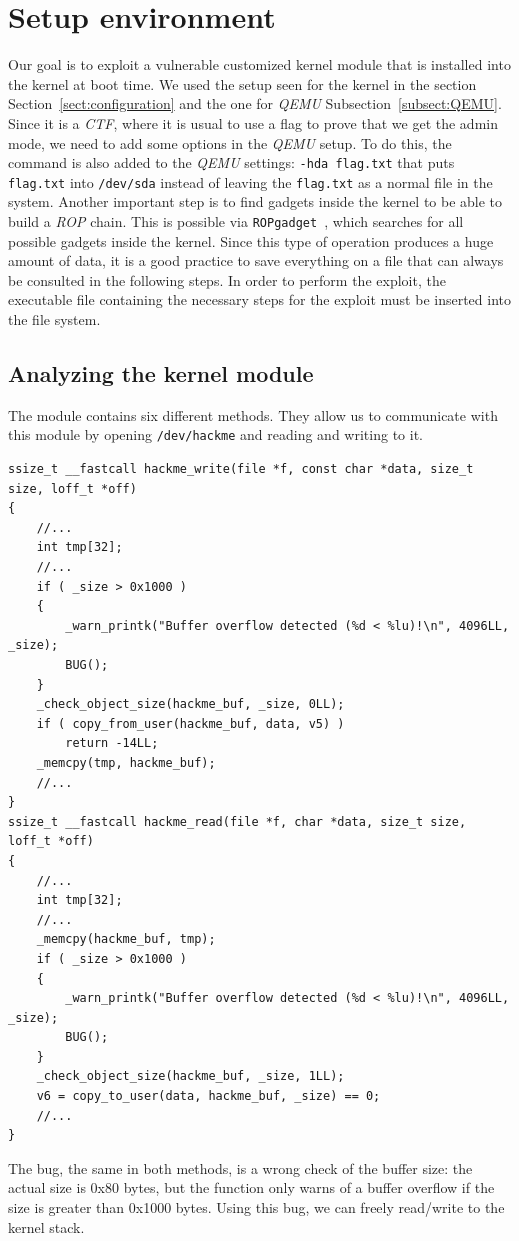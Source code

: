 \documentclass{masterthesis}
\newcommand{\refToSection}[1]{Section~\ref{sect:#1}\xspace}
\newcommand{\refToSubSection}[1]{Subsection~\ref{subsect:#1}\xspace}
\begin{document}
\section{Setup environment}
\label{sect:set-up}
Our goal is to exploit a vulnerable customized kernel module that is installed into the kernel at boot time.
We used the setup seen for the kernel in the section \refToSection{configuration} and the one for \emph{QEMU} \refToSubSection{QEMU}.
Since it is a \emph{CTF}, where it is usual to use a flag to prove that we get the admin mode, we need to add some options in the \emph{QEMU} setup.
To do this, the command is also added to the \emph{QEMU} settings:
\lstinline{-hda flag.txt}
that puts \texttt{flag.txt} into \texttt{/dev/sda} instead of leaving the \texttt{flag.txt} as a normal file in the system.
Another important step is to find gadgets inside the kernel to be able to build a \emph{ROP} chain.
This is possible via \texttt{ROPgadget}~\cite{rop_gadget}, which searches for all possible gadgets inside the kernel.
Since this type of operation produces a huge amount of data, it is a good practice to save everything on a file that can always be consulted in the following steps.
In order to perform the exploit, the executable file containing the necessary steps for the exploit must be inserted into the file system.
\subsection{Analyzing the kernel module}
\label{subsect:hackme}
The module contains six different methods.
They allow us to communicate with this module by opening \lstinline{/dev/hackme} and reading and writing to it.
\begin{lstlisting}
ssize_t __fastcall hackme_write(file *f, const char *data, size_t size, loff_t *off)
{
    //...
    int tmp[32];
    //...
    if ( _size > 0x1000 )
    {
        _warn_printk("Buffer overflow detected (%d < %lu)!\n", 4096LL, _size);
        BUG();
    }
    _check_object_size(hackme_buf, _size, 0LL);
    if ( copy_from_user(hackme_buf, data, v5) )
        return -14LL;
    _memcpy(tmp, hackme_buf);
    //...
}
ssize_t __fastcall hackme_read(file *f, char *data, size_t size, loff_t *off)
{
    //...
    int tmp[32];
    //...
    _memcpy(hackme_buf, tmp);
    if ( _size > 0x1000 )
    {
        _warn_printk("Buffer overflow detected (%d < %lu)!\n", 4096LL, _size);
        BUG();
    }
    _check_object_size(hackme_buf, _size, 1LL);
    v6 = copy_to_user(data, hackme_buf, _size) == 0;
    //...
}
\end{lstlisting}
The bug, the same in both methods, is a wrong check of the buffer size: the actual size is 0x80 bytes, but the function only warns of a buffer overflow if the size is greater than 0x1000 bytes. Using this bug, we can freely read/write to the kernel stack.
\end{document}
